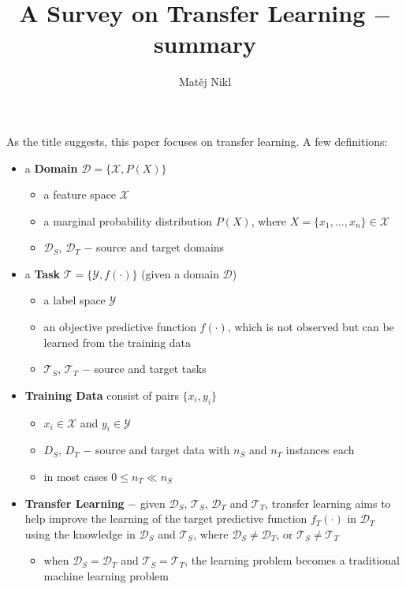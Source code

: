 \documentclass[a4paper,twocolumn]{article}
\title{A Survey on Transfer Learning $-$ summary}
\author{Matěj Nikl}
\newcommand{\D}{\mathcal{D}}
\newcommand{\T}{\mathcal{T}}
\newcommand{\X}{\mathcal{X}}
\newcommand{\Y}{\mathcal{Y}}
\begin{document}
\maketitle
As the title suggests, this paper focuses on transfer learning.
A few definitions:

\begin{itemize}
    \item a \textbf{Domain} $\D = \{\X, P(X)\}$
        \begin{itemize}
            \item a feature space $\X$
            \item a marginal probability distribution $P(X)$, where $X = \{x_1, \ldots, x_n\} \in \X$
            \item $\D_S$, $\D_T$ $-$ source and target domains
        \end{itemize}
    \item a \textbf{Task} $\T = \{\Y, f(\cdot)\}$ (given a domain $\D$)
        \begin{itemize}
            \item a label space $\Y$
            \item an objective predictive function $f(\cdot)$, which is not observed but can be learned from the training data
            \item $\T_S$, $\T_T$ $-$ source and target tasks
        \end{itemize}
    \item \textbf{Training Data} consist of pairs $\{x_i, y_i\}$
        \begin{itemize}
            \item $x_i \in \X$ and $y_i \in \Y$
            \item $D_S$, $D_T$ $-$ source and target data with $n_S$ and $n_T$ instances each
            \item in most cases $0 \le n_T \ll n_S$
        \end{itemize}
    \item \textbf{Transfer Learning} $-$ given $\D_S$, $\T_S$, $\D_T$ and $\T_T$, transfer learning aims to help improve the learning of the target predictive function $f_T(\cdot)$ in $\D_T$ using the knowledge in $\D_S$ and $\T_S$, where $\D_S \ne \D_T$, or $\T_S \ne \T_T$
        \begin{itemize}
            \item when $\D_S = \D_T$ and $\T_S = \T_T$, the learning problem becomes a traditional machine learning problem
        \end{itemize}
\end{itemize}
\end{document}
